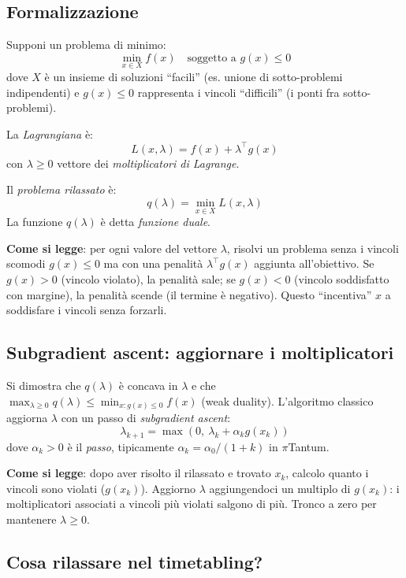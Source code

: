 \subsection{Formalizzazione}

Supponi un problema di minimo:
\[
  \min_{x \in X} f(x) \quad \text{soggetto a } g(x) \leq 0
\]
dove $X$ \`e un insieme di soluzioni ``facili'' (es. unione
di sotto-problemi indipendenti) e $g(x) \leq 0$ rappresenta
i vincoli ``difficili'' (i ponti fra sotto-problemi).

\begin{defbox}
La \emph{Lagrangiana} \`e:
\[
  L(x, \lambda) = f(x) + \lambda^\top g(x)
\]
con $\lambda \geq 0$ vettore dei \emph{moltiplicatori di
Lagrange}.

Il \emph{problema rilassato} \`e:
\[
  q(\lambda) = \min_{x \in X} L(x, \lambda)
\]
La funzione $q(\lambda)$ \`e detta \emph{funzione duale}.
\end{defbox}

\textbf{Come si legge}: per ogni valore del vettore $\lambda$,
risolvi un problema senza i vincoli scomodi $g(x) \leq 0$
ma con una penalit\`a $\lambda^\top g(x)$ aggiunta
all'obiettivo. Se $g(x) > 0$ (vincolo violato), la penalit\`a
sale; se $g(x) < 0$ (vincolo soddisfatto con margine), la
penalit\`a scende (il termine \`e negativo). Questo ``incentiva''
$x$ a soddisfare i vincoli senza forzarli.

\subsection{Subgradient ascent: aggiornare i moltiplicatori}

Si dimostra che $q(\lambda)$ \`e concava in $\lambda$ e che
$\max_{\lambda \geq 0} q(\lambda) \leq \min_{x: g(x) \leq 0} f(x)$
(weak duality). L'algoritmo classico aggiorna $\lambda$ con
un passo di \emph{subgradient ascent}:
\[
  \lambda_{k+1} = \max\left(0,\ \lambda_k + \alpha_k g(x_k)\right)
\]
dove $\alpha_k > 0$ \`e il \emph{passo}, tipicamente
$\alpha_k = \alpha_0 / (1 + k)$ in $\pi$Tantum.

\textbf{Come si legge}: dopo aver risolto il rilassato e
trovato $x_k$, calcolo quanto i vincoli sono violati ($g(x_k)$).
Aggiorno $\lambda$ aggiungendoci un multiplo di $g(x_k)$:
i moltiplicatori associati a vincoli pi\`u violati salgono di
pi\`u. Tronco a zero per mantenere $\lambda \geq 0$.

\subsection{Cosa rilassare nel timetabling?}

